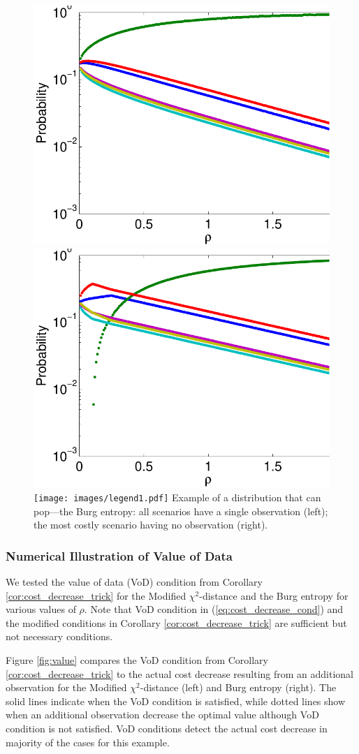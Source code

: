 \documentclass[opre,nonblindrev]{informs3} %
\begin{document}
\begin{figure}[h]
	\FIGURE
	{%
		\includegraphics*[width=.40\textwidth]{images/burg}%
		\includegraphics*[width=.40\textwidth]{images/burg_zero}%
		\texttt{[image: images/legend1.pdf]}
	}
	{
		Example of a distribution that can pop---the Burg entropy: 
		all scenarios have a single observation (left); 
		 the most costly scenario having no observation (right).
		\label{fig:pop}
	}
	{}
\end{figure}

\subsubsection{Numerical Illustration of Value of Data}
\label{ssec:numerical_value_of_data}

We tested the value of data (VoD) condition from Corollary \ref{cor:cost_decrease_trick} for the Modified $\chi^2$-distance and the Burg entropy for various values of $\rho$. 
Note that VoD condition in (\ref{eq:cost_decrease_cond}) and the modified conditions in Corollary \ref{cor:cost_decrease_trick} are sufficient but not necessary conditions.

Figure \ref{fig:value} compares the VoD condition from Corollary \ref{cor:cost_decrease_trick} to the actual cost decrease resulting from an additional observation for the Modified $\chi^2$-distance (left) and Burg entropy (right). 
The solid lines indicate when the VoD condition is satisfied, while dotted lines show when an additional observation decrease the optimal value although VoD condition is not satisfied.
VoD conditions detect the actual cost decrease in majority of the cases for this example. 
\end{document}
